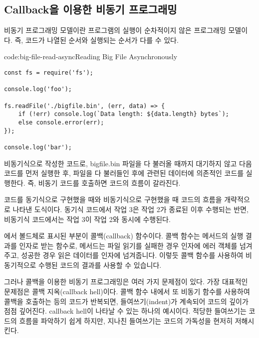 \subsection*{Callback을 이용한 비동기 프로그래밍}

비동기 프로그래밍 모델이란 프로그램의 실행이 순차적이지 않은 프로그래밍 모델이다. 즉, 코드가 나열된 순서와 실행되는 순서가 다를 수 있다.

\begin{codeenv}{code:big-file-read-async}{Reading Big File Asynchronously}\begin{verbatim}
const fs = require('fs');

console.log('foo');

fs.readFile('./bigfile.bin', (err, data) => {
    if (!err) console.log(`Data length: ${data.length} bytes`);
    else console.error(err);
});

console.log('bar');
\end{verbatim}
\end{codeenv}

\는 \를 비동기식으로 작성한 코드로, bigfile.bin 파일을 다 불러올 때까지 대기하지 않고 다음 코드를 먼저 실행한 후, 파일을 다 불러들인 후에 관련된 데이터에 의존적인 코드를 실행한다. 즉, 비동기 코드를 호출하면 코드의 흐름이 갈라진다.


\는 코드를 동기식으로 구현했을 때와 비동기식으로 구현했을 때 코드의 흐름을 개략적으로 나타낸 도식이다. 동기식 코드에서 작업 3은 작업 2가 종료된 이후 수행되는 반면, 비동기식 코드에서는 작업 3이 작업 2와 동시에 수행된다.

에서 볼드체로 표시된 부분이 콜백(callback) 함수이다. 콜백 함수는 메서드의 실행 결과를 인자로 받는 함수로,  메서드는 파일 읽기를 실패한 경우  인자에 에러 객체를 넘겨주고, 성공한 경우 읽은 데이터를  인자에 넘겨줍니다. 이렇듯 콜백 함수를 사용하여 비동기적으로 수행된 코드의 결과를 사용할 수 있습니다.

그러나 콜백을 이용한 비동기 프로그래밍은 여러 가지 문제점이 있다. 가장 대표적인 문제점은 콜백 지옥(callback hell)이다. 콜백 함수 내에서 또 비동기 함수를 사용하여 콜백을 호출하는 등의 코드가 반복되면, 들여쓰기(indent)가 계속되어 코드의 깊이가 점점 깊어진다. \은 callback hell이 나타날 수 있는 하나의 예시이다. 적당한 들여쓰기는 코드의 흐름을 파악하기 쉽게 하지만, 지나친 들여쓰기는 코드의 가독성을 현저히 저해시킨다.

